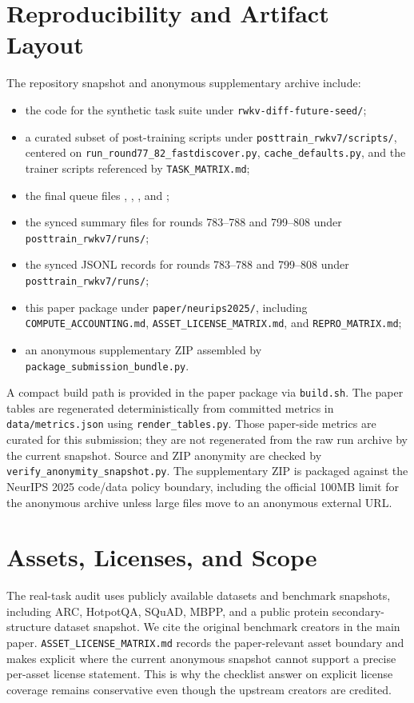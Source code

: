 \section{Reproducibility and Artifact Layout}
The repository snapshot and anonymous supplementary archive include:
\begin{itemize}
    \item the code for the synthetic task suite under \texttt{rwkv-diff-future-seed/};
    \item a curated subset of post-training scripts under \texttt{posttrain\_rwkv7/scripts/}, centered on \texttt{run\_round77\_82\_fastdiscover.py}, \texttt{cache\_defaults.py}, and the trainer scripts referenced by \texttt{TASK\_MATRIX.md};
    \item the final queue files , , , and ;
    \item the synced summary files for rounds 783--788 and 799--808 under \texttt{posttrain\_rwkv7/runs/};
    \item the synced JSONL records for rounds 783--788 and 799--808 under \texttt{posttrain\_rwkv7/runs/};
    \item this paper package under \texttt{paper/neurips2025/}, including \texttt{COMPUTE\_ACCOUNTING.md}, \texttt{ASSET\_LICENSE\_MATRIX.md}, and \texttt{REPRO\_MATRIX.md};
    \item an anonymous supplementary ZIP assembled by \texttt{package\_submission\_bundle.py}.
\end{itemize}
A compact build path is provided in the paper package via \texttt{build.sh}. The paper tables are regenerated deterministically from committed metrics in \texttt{data/metrics.json} using \texttt{render\_tables.py}. Those paper-side metrics are curated for this submission; they are not regenerated from the raw run archive by the current snapshot. Source and ZIP anonymity are checked by \texttt{verify\_anonymity\_snapshot.py}. The supplementary ZIP is packaged against the NeurIPS 2025 code/data policy boundary, including the official 100MB limit for the anonymous archive unless large files move to an anonymous external URL.

\section{Assets, Licenses, and Scope}
The real-task audit uses publicly available datasets and benchmark snapshots, including ARC, HotpotQA, SQuAD, MBPP, and a public protein secondary-structure dataset snapshot. We cite the original benchmark creators in the main paper. \texttt{ASSET\_LICENSE\_MATRIX.md} records the paper-relevant asset boundary and makes explicit where the current anonymous snapshot cannot support a precise per-asset license statement. This is why the checklist answer on explicit license coverage remains conservative even though the upstream creators are credited.

